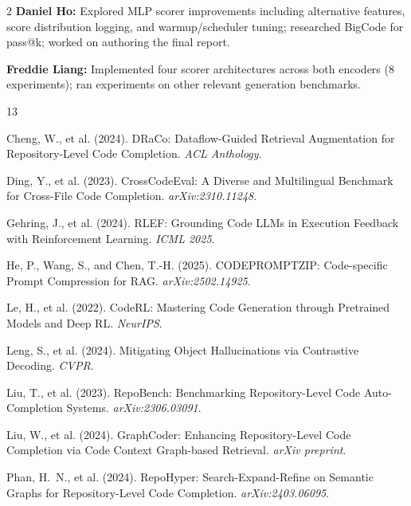 \documentclass[11pt,a4paper]{article}
\begin{document}
\begin{multicols}{2}
\noindent\textbf{Daniel Ho:} Explored MLP scorer improvements including alternative features, score distribution logging, and warmup/scheduler tuning; researched BigCode for pass@k; worked on authoring the final report.

\noindent\textbf{Freddie Liang:} Implemented four scorer architectures across both encoders (8 experiments); ran experiments on other relevant generation benchmarks.


\begin{thebibliography}{13}

Cheng, W., et al. (2024).
\newblock DRaCo: Dataflow-Guided Retrieval Augmentation for Repository-Level Code Completion.
\newblock \textit{ACL Anthology}.

Ding, Y., et al. (2023).
\newblock CrossCodeEval: A Diverse and Multilingual Benchmark for Cross-File Code Completion.
\newblock \textit{arXiv:2310.11248}.

Gehring, J., et al. (2024).
\newblock RLEF: Grounding Code LLMs in Execution Feedback with Reinforcement Learning.
\newblock \textit{ICML 2025}.

He, P., Wang, S., and Chen, T.-H. (2025).
\newblock CODEPROMPTZIP: Code-specific Prompt Compression for RAG.
\newblock \textit{arXiv:2502.14925}.

Le, H., et al. (2022).
\newblock CodeRL: Mastering Code Generation through Pretrained Models and Deep RL.
\newblock \textit{NeurIPS}.

Leng, S., et al. (2024).
\newblock Mitigating Object Hallucinations via Contrastive Decoding.
\newblock \textit{CVPR}.

Liu, T., et al. (2023).
\newblock RepoBench: Benchmarking Repository-Level Code Auto-Completion Systems.
\newblock \textit{arXiv:2306.03091}.

Liu, W., et al. (2024).
\newblock GraphCoder: Enhancing Repository-Level Code Completion via Code Context Graph-based Retrieval.
\newblock \textit{arXiv preprint}.

Phan, H.~N., et al. (2024).
\newblock RepoHyper: Search-Expand-Refine on Semantic Graphs for Repository-Level Code Completion.
\newblock \textit{arXiv:2403.06095}.


\end{thebibliography}
\end{multicols}
\end{document}
